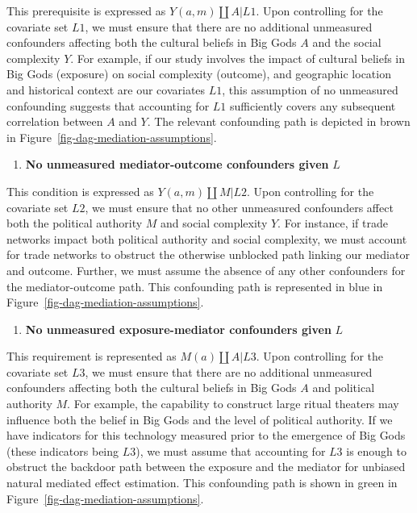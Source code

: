 \documentclass[
  singlecolumn]{report}
\providecommand{\tightlist}{%
  \setlength{\itemsep}{0pt}\setlength{\parskip}{0pt}}\usepackage{longtable,booktabs,array}
\begin{document}
This prerequisite is expressed as \(Y(a,m) \coprod A | L1\). Upon
controlling for the covariate set \(L1\), we must ensure that there are
no additional unmeasured confounders affecting both the cultural beliefs
in Big Gods \(A\) and the social complexity \(Y\). For example, if our
study involves the impact of cultural beliefs in Big Gods (exposure) on
social complexity (outcome), and geographic location and historical
context are our covariates \(L1\), this assumption of no unmeasured
confounding suggests that accounting for \(L1\) sufficiently covers any
subsequent correlation between \(A\) and \(Y\). The relevant confounding
path is depicted in brown in Figure~\ref{fig-dag-mediation-assumptions}.

\begin{enumerate}
\def\labelenumi{\arabic{enumi}.}
\setcounter{enumi}{1}
\tightlist
\item
  \textbf{No unmeasured mediator-outcome confounders given} \(L\)
\end{enumerate}

This condition is expressed as \(Y(a,m) \coprod M | L2\). Upon
controlling for the covariate set \(L2\), we must ensure that no other
unmeasured confounders affect both the political authority \(M\) and
social complexity \(Y\). For instance, if trade networks impact both
political authority and social complexity, we must account for trade
networks to obstruct the otherwise unblocked path linking our mediator
and outcome. Further, we must assume the absence of any other
confounders for the mediator-outcome path. This confounding path is
represented in blue in Figure~\ref{fig-dag-mediation-assumptions}.

\begin{enumerate}
\def\labelenumi{\arabic{enumi}.}
\setcounter{enumi}{2}
\tightlist
\item
  \textbf{No unmeasured exposure-mediator confounders given} \(L\)
\end{enumerate}

This requirement is represented as \(M(a) \coprod A | L3\). Upon
controlling for the covariate set \(L3\), we must ensure that there are
no additional unmeasured confounders affecting both the cultural beliefs
in Big Gods \(A\) and political authority \(M\). For example, the
capability to construct large ritual theaters may influence both the
belief in Big Gods and the level of political authority. If we have
indicators for this technology measured prior to the emergence of Big
Gods (these indicators being \(L3\)), we must assume that accounting for
\(L3\) is enough to obstruct the backdoor path between the exposure and
the mediator for unbiased natural mediated effect estimation. This
confounding path is shown in green in
Figure~\ref{fig-dag-mediation-assumptions}.
\end{document}
